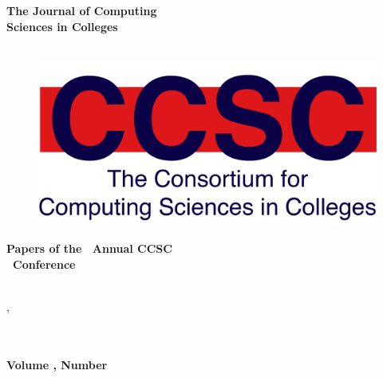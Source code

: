 \documentclass{article}
\begin{document}
\thispagestyle{empty}

\begin{textsf}

\begin{center}
\textbf{\Huge{
The Journal of Computing\\
Sciences in Colleges\\
}}\\
\end{center}

\vspace{30pt}

\begin{figure}[h]
\includegraphics[scale=0.7]{CCSC_logo.png}
\centering
\end{figure}

\begin{center}
\textbf{\Large{
Papers of the \confOrdinal\ Annual CCSC\\
\confName\ Conference\\
}}\\
\end{center}

\vspace{10pt}

\begingroup
\centering
\large{\confDates, \confYear}\\
\large{\confSchool}\\
\large{\confCity}\\
\endgroup

\vfill

{\parindent0pt
\textbf{\Large Volume \journalVolume, Number \journalNumber} \hfill
\textbf{\Large \journalMonth\ \journalYear}
}
\end{textsf}
\end{document}
